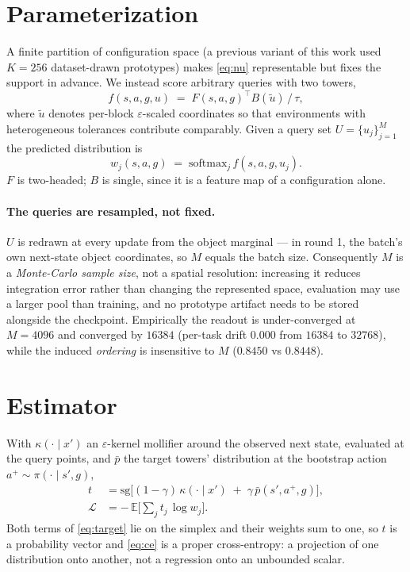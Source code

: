 \documentclass{article}
\providecommand{\E}{\mathbb{E}}
\newcommand{\sg}{\mathrm{sg}}
\begin{document}
\section{Parameterization}

A finite partition of configuration space (a previous variant of this work used $K=256$
dataset-drawn prototypes) makes \eqref{eq:nu} representable but fixes the support in
advance. We instead score arbitrary queries with two towers,
\begin{equation}
f(s,a,g,u) \;=\; F(s,a,g)^{\top} B(\tilde u)\,/\,\tau ,
\label{eq:score}
\end{equation}
where $\tilde u$ denotes per-block $\varepsilon$-scaled coordinates so that environments
with heterogeneous tolerances contribute comparably. Given a query set
$U=\{u_j\}_{j=1}^{M}$ the predicted distribution is
\begin{equation}
w_j(s,a,g) \;=\; \mathrm{softmax}_j\, f(s,a,g,u_j) .
\label{eq:w}
\end{equation}
$F$ is two-headed; $B$ is single, since it is a feature map of a configuration alone.

\paragraph{The queries are resampled, not fixed.} $U$ is redrawn at every update from the
object marginal --- in round 1, the batch's own next-state object coordinates, so $M$
equals the batch size. Consequently $M$ is a \emph{Monte-Carlo sample size}, not a spatial
resolution: increasing it reduces integration error rather than changing the represented
space, evaluation may use a larger pool than training, and no prototype artifact needs to
be stored alongside the checkpoint. Empirically the readout is under-converged at
$M{=}4096$ and converged by $16384$ (per-task drift $0.000$ from $16384$ to $32768$),
while the induced \emph{ordering} is insensitive to $M$ ($0.8450$ vs $0.8448$).

\section{Estimator}

With $\kappa(\cdot\mid x')$ an $\varepsilon$-kernel mollifier around the observed next
state, evaluated at the query points, and $\bar p$ the target towers' distribution at the
bootstrap action $a^{+}\sim\pi(\cdot\mid s',g)$,
\begin{align}
t &= \sg\big[(1-\gamma)\,\kappa(\cdot\mid x') \;+\; \gamma\,\bar p(s',a^{+},g)\big],
\label{eq:target}\\
\mathcal{L} &= -\,\E\Big[\textstyle\sum_j t_j\,\log w_j\Big].
\label{eq:ce}
\end{align}
Both terms of \eqref{eq:target} lie on the simplex and their weights sum to one, so $t$ is
a probability vector and \eqref{eq:ce} is a proper cross-entropy: a projection of one
distribution onto another, not a regression onto an unbounded scalar.
\end{document}
